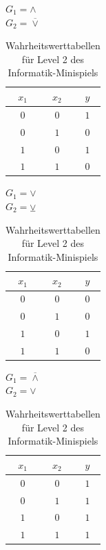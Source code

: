 \begin{table}[h!]
    \centering
    \begin{minipage}{.33\textwidth}
        $G_1 = \land$\\
        $G_2 = \overline{\lor}$
        \vfill
        \begin{tabular}{|c|c|c|} 
            \hline
            $x_1$ & $x_2$ & $y$ \\
            \hline\hline
            $0$ & $0$ & $1$ \\
            $0$ & $1$ & $0$ \\
            $1$ & $0$ & $1$ \\
            $1$ & $1$ & $0$ \\
            \hline
        \end{tabular}
    \end{minipage}
    \hfill
    \begin{minipage}{.32\textwidth}
        $G_1 = \lor$\\
        $G_2 = \veebar$
        \vfill
        \begin{tabular}{|c|c|c|} 
            \hline
            $x_1$ & $x_2$ & $y$ \\
            \hline\hline
            $0$ & $0$ & $0$ \\
            $0$ & $1$ & $0$ \\
            $1$ & $0$ & $1$ \\
            $1$ & $1$ & $0$ \\
            \hline
        \end{tabular}
    \end{minipage}
    \hfill
    \begin{minipage}{.33\textwidth}
        $G_1 = \overline{\land}$\\
        $G_2 = \lor$
        \vfill
        \begin{tabular}{|c|c|c|} 
            \hline
            $x_1$ & $x_2$ & $y$ \\
            \hline\hline
            $0$ & $0$ & $1$ \\
            $0$ & $1$ & $1$ \\
            $1$ & $0$ & $1$ \\
            $1$ & $1$ & $1$ \\
            \hline
        \end{tabular}
    \end{minipage}
    \caption{Wahrheitswerttabellen für Level 2 des Informatik-Minispiels}
    \label{tab:wwt02}
\end{table}

